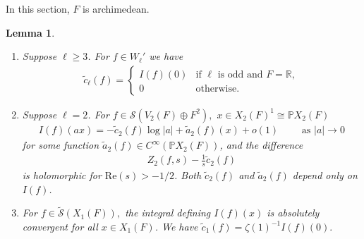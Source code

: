 \documentclass[11pt,a4paper,reqno]{amsart}
\newtheorem{lem}[thm]{Lemma}
\theoremstyle{remark}
\numberwithin{equation}{section}
\newcommand{\RR}{\mathbb{R}}
\theoremstyle{definition}
\numberwithin{equation}{section}
\begin{document}
In this section, $F$ is archimedean. 

\begin{lem}\label{lem:easy:arch}
\begin{enumerate}[label=(\roman*)]
    \item  Suppose $\ell\ge 3$. For $f\in W_\ell'$ we have
    \begin{align*}
        \tilde{c}_\ell(f)=\begin{cases}
            I(f)(0) &\textrm{if } \ell \textrm{ is odd and }F=\RR,\\
            0 & \textrm{otherwise.}
        \end{cases}
    \end{align*}     
    \item Suppose $\ell=2$. For $f\in\mathcal{S}(V_2(F)\oplus F^2),$ $x\in X_{2}(F)^1\cong \mathbb{P}X_2(F)$ 
    \begin{align*} 
        I(f)(ax)=-\tilde{c}_2(f)\log|a|+\tilde{a}_2(f)(x)+o(1) \quad\quad \textrm{ as } |a|\to 0
    \end{align*}
    for some function $\tilde{a}_2(f)\in C^\infty(\mathbb{P}X_2(F))$, and the difference
    \begin{align*}
 Z_{2}(f,s)-\frac{1}{s}\tilde{c}_2(f)
    \end{align*}
    is holomorphic for $\mathrm{Re}(s)>-1/2$. Both $\tilde{c}_2(f)$ and $\tilde{a}_2(f)$ depend only on $I(f)$.
    \item For $f\in \widetilde{\mathcal{S}}(X_1(F)),$ the integral defining $I(f)(x)$ is absolutely convergent for all $x\in X_1(F)$. We have $\tilde{c}_1(f)=\zeta(1)^{-1}I(f)(0).$
\end{enumerate}

\end{lem}
\end{document}
